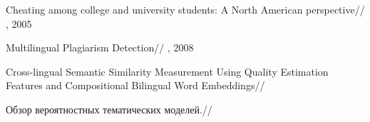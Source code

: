 \documentclass[12pt, twoside]{article}
\begin{document}
\begin{thebibliography}{4}

    Cheating among college and university students: A North American perspective//
    , 2005
    
    Multilingual Plagiarism Detection//
    , 2008
    
    Cross-lingual Semantic Similarity Measurement Using Quality Estimation Features and Compositional Bilingual Word Embeddings//
    
    Обзор вероятностных тематических моделей.//


	  
\end{thebibliography}
\end{document}
